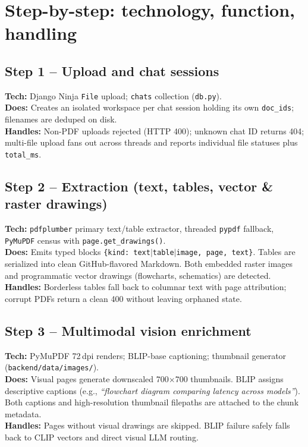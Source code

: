 \documentclass[11pt,a4paper]{article}
\begin{document}
\section{Step-by-step: technology, function, handling}
\subsection{Step 1 -- Upload and chat sessions}
\textbf{Tech:} Django Ninja \texttt{File} upload; \texttt{chats} collection (\texttt{db.py}).\\
\textbf{Does:} Creates an isolated workspace per chat session holding its own \texttt{doc\_ids}; filenames are deduped on disk.\\
\textbf{Handles:} Non-PDF uploads rejected (HTTP 400); unknown chat ID returns 404; multi-file upload fans out across threads and reports individual file statuses plus \texttt{total\_ms}.

\subsection{Step 2 -- Extraction (text, tables, vector \& raster drawings)}
\textbf{Tech:} \texttt{pdfplumber} primary text/table extractor, threaded \texttt{pypdf} fallback, \texttt{PyMuPDF} census with \texttt{page.get\_drawings()}.\\
\textbf{Does:} Emits typed blocks \texttt{\{kind: text$|$table$|$image, page, text\}}. Tables are serialized into clean GitHub-flavored Markdown. Both embedded raster images and programmatic vector drawings (flowcharts, schematics) are detected.\\
\textbf{Handles:} Borderless tables fall back to columnar text with page attribution; corrupt PDFs return a clean 400 without leaving orphaned state.

\subsection{Step 3 -- Multimodal vision enrichment}
\textbf{Tech:} PyMuPDF 72\,dpi renders; BLIP-base captioning; thumbnail generator (\texttt{backend/data/images/}).\\
\textbf{Does:} Visual pages generate downscaled 700$\times$700 thumbnails. BLIP assigns descriptive captions (e.g., \emph{``flowchart diagram comparing latency across models''}). Both captions and high-resolution thumbnail filepaths are attached to the chunk metadata.\\
\textbf{Handles:} Pages without visual drawings are skipped. BLIP failure safely falls back to CLIP vectors and direct visual LLM routing.
\end{document}
